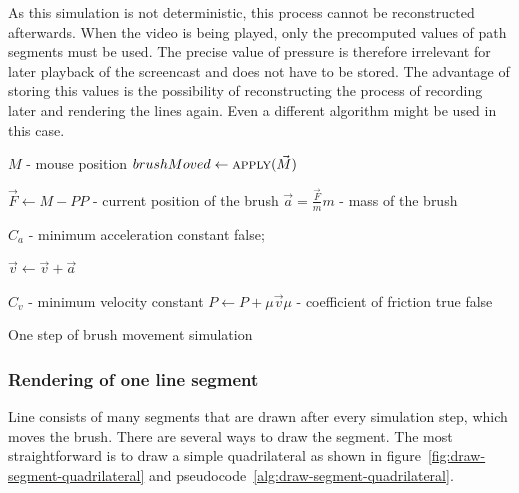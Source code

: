As this simulation is not deterministic, this process cannot be reconstructed afterwards. When the video is being played, only the precomputed values of path segments must be used. The precise value of pressure is therefore irrelevant for later playback of the screencast and does not have to be stored. The advantage of storing this values is the possibility of reconstructing the process of recording later and rendering the lines again. Even a different algorithm might be used in this case.

\begin{pseudocode}
  \begin{algorithmic}

  	 \Comment $M$ - mouse position
	      \State $brushMoved \gets \Call{apply}{\vec{M}} $
              \State {}
          \EndIf
      \EndIf
 	\EndFunction

      \State $ \vec{F} \gets M - P $\Comment $P$ - current position of the brush
      \State $ \vec{a} = \frac{\vec{F}}{m} $\Comment $m$ - mass of the brush

       \Comment $C_a$ - minimum acceleration constant
	      \State \Return false;    
       \EndIf
      
      \State $\vec{v} \gets \vec{v} + \vec{a}$

       \Comment $C_v$ - minimum velocity constant
          \State $ P \gets P + \mu\vec{v} $\Comment $\mu$ - coefficient of friction
		  \State \Return true
      \EndIf
      \State \Return false
  	\EndFunction
  \end{algorithmic}
\caption{One step of brush movement simulation}
\label{alg:one-step}
\end{pseudocode}

\subsubsection*{Rendering of one line segment}

Line consists of many segments that are drawn after every simulation step, which moves the brush. There are several ways to draw the segment. The most straightforward is to draw a simple quadrilateral as shown in figure~\ref{fig:draw-segment-quadrilateral} and pseudocode~\ref{alg:draw-segment-quadrilateral}.

